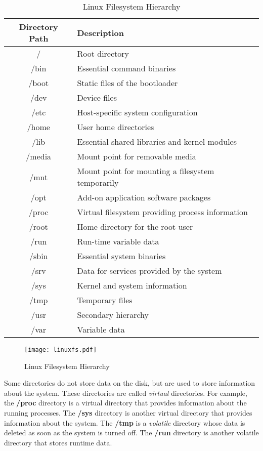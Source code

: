 \begin{table*}[h!]
\caption{Linux Filesystem Hierarchy}
\begin{tabular}{ c l }
  \toprule
 Directory Path & Description \\
 \midrule
  / & Root directory \\
  /bin & Essential command binaries \\
  /boot & Static files of the bootloader \\
  /dev & Device files \\
  /etc & Host-specific system configuration \\
  /home & User home directories \\
  /lib & Essential shared libraries and kernel modules \\
  /media & Mount point for removable media \\
  /mnt & Mount point for mounting a filesystem temporarily \\
  /opt & Add-on application software packages \\
  /proc & Virtual filesystem providing process information \\
  /root & Home directory for the root user \\
  /run & Run-time variable data \\
  /sbin & Essential system binaries \\
  /srv & Data for services provided by the system \\
  /sys & Kernel and system information \\
  /tmp & Temporary files \\
  /usr & Secondary hierarchy \\
  /var & Variable data \\
  \bottomrule
\end{tabular}
\end{table*}

\begin{figure}[h!]
	\texttt{[image: linuxfs.pdf]}
	\caption[Linux Filesystem Hierarchy]{Linux Filesystem Hierarchy}
\end{figure}

Some directories do not store data on the disk, but are used to store information about the system.
These directories are called \textit{virtual} directories.
For example, the \textbf{/proc} directory is a virtual directory that provides information about the running processes.
The \textbf{/sys} directory is another virtual directory that provides information about the system.
The \textbf{/tmp} is a \textit{volatile} directory whose data is deleted as soon as the system is turned off.
The \textbf{/run} directory is another volatile directory that stores runtime data.

